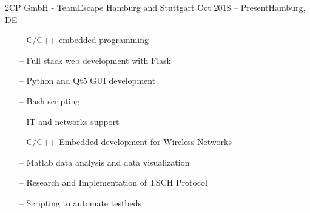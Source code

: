 \documentclass[10pt,a4paper]{altacv}
\begin{document}
\tagline{}

%

\begin{fullwidth}
    \makecvheader
\end{fullwidth}

%




{2CP GmbH - TeamEscape Hamburg and Stuttgart}
{Oct 2018 -- Present}{Hamburg, DE}

\begin{itemize}
    \setlength{\itemindent}{0.5em}
    \item[--] \small{C/C++ embedded programming }
    \item[--] \small{Full stack web development with Flask}
    \item[--] \small{Python and Qt5 GUI development}
    \item[--] \small{Bash scripting}
    \item[--] \small{IT and networks support}
\end{itemize}

\medskip



\begin{itemize}
    \setlength{\itemindent}{0.5em}
    \item[--]   \small{C/C++ Embedded development for Wireless Networks}
    \item[--]   \small{Matlab data analysis and data visualization}
    \item[--]   \small{Research and Implementation of TSCH Protocol}
    \item[--]   \small{Scripting to automate testbeds}
\end{itemize}
\end{document}
